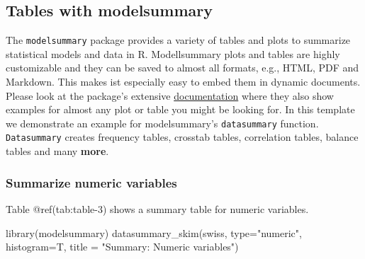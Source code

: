 \documentclass[
  letterpaper,
  DIV=11,
  numbers=noendperiod]{scrartcl}
\newenvironment{Shaded}{\begin{snugshade}}{\end{snugshade}}
\newcommand{\AttributeTok}[1]{\textcolor[rgb]{0.40,0.45,0.13}{#1}}
\newcommand{\FunctionTok}[1]{\textcolor[rgb]{0.28,0.35,0.67}{#1}}
\newcommand{\NormalTok}[1]{\textcolor[rgb]{0.00,0.23,0.31}{#1}}
\newcommand{\StringTok}[1]{\textcolor[rgb]{0.13,0.47,0.30}{#1}}
\begin{document}
\hypertarget{tables-with-modelsummary}{%
\subsection{Tables with modelsummary}\label{tables-with-modelsummary}}

The \texttt{modelsummary} package provides a variety of tables and plots
to summarize statistical models and data in R. Modellsummary plots and
tables are highly customizable and they can be saved to almost all
formats, e.g., HTML, PDF and Markdown. This makes ist especially easy to
embed them in dynamic documents. Please look at the package's extensive
\href{https://vincentarelbundock.github.io/modelsummary/index.html}{documentation}
where they also show examples for almost any plot or table you might be
looking for. In this template we demonstrate an example for
modelsummary's \texttt{datasummary} function. \texttt{Datasummary}
creates frequency tables, crosstab tables, correlation tables, balance
tables and many \textbf{more}.

\hypertarget{summarize-numeric-variables}{%
\subsubsection{Summarize numeric
variables}\label{summarize-numeric-variables}}

Table @ref(tab:table-3) shows a summary table for numeric variables.

\begin{Shaded}
\begin{Highlighting}[]
\FunctionTok{library}\NormalTok{(modelsummary)}
\FunctionTok{datasummary\_skim}\NormalTok{(swiss, }
                 \AttributeTok{type=}\StringTok{"numeric"}\NormalTok{, }
                 \AttributeTok{histogram=}\NormalTok{T, }
                 \AttributeTok{title =} \StringTok{"Summary: Numeric variables"}\NormalTok{)}
\end{Highlighting}
\end{Shaded}
\end{document}
